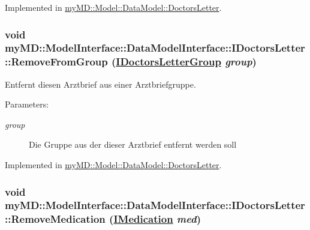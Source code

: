 Implemented in \hyperlink{classmy_m_d_1_1_model_1_1_data_model_1_1_doctors_letter_d30d4a881bdfd437b1b1da6f3fa7cb38}{my\-MD::Model::Data\-Model::Doctors\-Letter}.\hypertarget{interfacemy_m_d_1_1_model_interface_1_1_data_model_interface_1_1_i_doctors_letter_921a6a4ce8826ab9e42d5d5b22a5bc79}{
\subsubsection[RemoveFromGroup]{\setlength{\rightskip}{0pt plus 5cm}void my\-MD::Model\-Interface::Data\-Model\-Interface::IDoctors\-Letter::Remove\-From\-Group (\hyperlink{interfacemy_m_d_1_1_model_interface_1_1_data_model_interface_1_1_i_doctors_letter_group}{IDoctors\-Letter\-Group} {\em group})}}
\label{db/d8c/interfacemy_m_d_1_1_model_interface_1_1_data_model_interface_1_1_i_doctors_letter_921a6a4ce8826ab9e42d5d5b22a5bc79}


Entfernt diesen Arztbrief aus einer Arztbriefgruppe. 

\begin{Desc}
\item[Parameters:]
\begin{description}
\item[{\em group}]Die Gruppe aus der dieser Arztbrief entfernt werden soll\end{description}
\end{Desc}


Implemented in \hyperlink{classmy_m_d_1_1_model_1_1_data_model_1_1_doctors_letter_921a6a4ce8826ab9e42d5d5b22a5bc79}{my\-MD::Model::Data\-Model::Doctors\-Letter}.\hypertarget{interfacemy_m_d_1_1_model_interface_1_1_data_model_interface_1_1_i_doctors_letter_21bff2bea1b5f08bc7e79dd65b9ccf16}{
\subsubsection[RemoveMedication]{\setlength{\rightskip}{0pt plus 5cm}void my\-MD::Model\-Interface::Data\-Model\-Interface::IDoctors\-Letter::Remove\-Medication (\hyperlink{interfacemy_m_d_1_1_model_interface_1_1_data_model_interface_1_1_i_medication}{IMedication} {\em med})}}
\label{db/d8c/interfacemy_m_d_1_1_model_interface_1_1_data_model_interface_1_1_i_doctors_letter_21bff2bea1b5f08bc7e79dd65b9ccf16}


